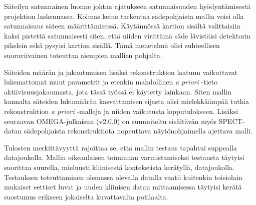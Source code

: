 Säteilyn satunnainen luonne johtaa ajatukseen satunnaisuuden hyödyntämisestä projektion laskennassa. Kolmas keino tarkentaa sädepohjaista mallia voisi olla satunnaisuus säteen määrittämisessä. Käytännössä kartion sisältä valittaisiin kaksi pistettä satunnaisesti siten, että niiden virittämä säde lävistäisi detektorin pikslein sekä pysyisi kartion sisällä. Tämä menetelmä olisi suhteellisen suoraviivainen toteuttaa aiempien mallien pohjalta.

Säteiden määrän ja jakautumisen lisäksi rekonstruktion laatuun vaikuttavat lukemattomat muut parametrit ja etenkin mahdollinen \textit{a priori} -tieto aktiivisuusjakaumasta, jota tässä työssä ei käytetty lainkaan. Siten mallin kannalta säteiden lukumäärän kasvattamisen sijasta olisi mielekkäämpää tutkia rekonstruktion \textit{a priori} -malleja ja niiden vaikutusta lopputulokseen. Lisäksi seuraavan OMEGA-julkaisun (v2.0.0) on suunniteltu sisältävän myös SPECT-datan sädepohjaista rekonstruktiota nopeuttava näytönohjaimella ajettava malli.

Tulosten merkittävyyttä rajoittaa se, että mallin testaus tapahtui suppealla datajoukolla. Mallin oikeanlaisen toiminnan varmistamiseksi testausta täytyisi suorittaa suurella, mieluusti kliinisestä kontekstista kerätyllä, datajoukolla. Testauksen toteuttaminen olemassa olevalla datalla vaatii kuitenkin toisiolain mukaiset eettiset luvat ja uuden kliinisen datan mittaamisessa täytyisi kerätä suostumus erikseen jokaiselta kuvattavalta potilaalta.